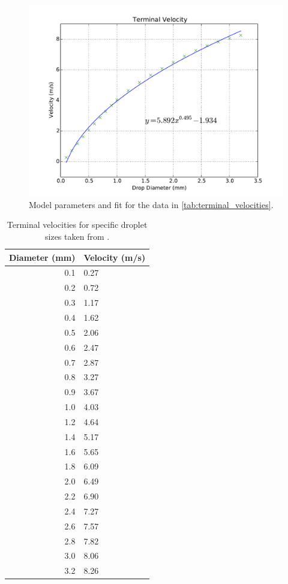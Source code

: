\documentclass[twocolumn,a4paper,10pt]{article}
\begin{document}
\begin{figure}[h]
    \centering
    \includegraphics[width=1.00\linewidth]{terminal_velocity_model.pdf}
    \caption{Model parameters and fit for the data in
        \autoref{tab:terminal_velocities}.}
    \label{fig:terminal_velocities}
\end{figure}

\begin{table}[h]
    \centering
    \begin{tabular}{|r|l|}
        \hline
        Diameter (mm) &  Velocity (m/s) \\
        \hline
        0.1 &            0.27 \\
        0.2 &            0.72 \\
        0.3 &            1.17 \\
        0.4 &            1.62 \\
        0.5 &            2.06 \\
        0.6 &            2.47 \\
        0.7 &            2.87 \\
        0.8 &            3.27 \\
        0.9 &            3.67 \\
        1.0 &            4.03 \\
        1.2 &            4.64 \\
        1.4 &            5.17 \\
        1.6 &            5.65 \\
        1.8 &            6.09 \\
        2.0 &            6.49 \\
        2.2 &            6.90 \\
        2.4 &            7.27 \\
        2.6 &            7.57 \\
        2.8 &            7.82 \\
        3.0 &            8.06 \\
        3.2 &            8.26 \\
        \hline
    \end{tabular}
    \caption{Terminal velocities for specific droplet sizes taken from
        \citet{terminal}.}
    \label{tab:terminal_velocities}
\end{table}
\end{document}
